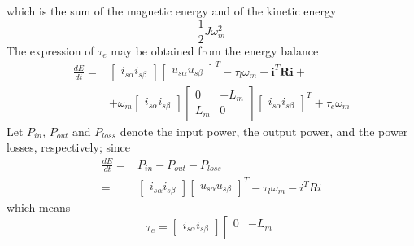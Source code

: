 \documentclass[12pt,a4paper]{scrartcl}
\begin{document}
\begin{onehalfspace}
which is the sum of the magnetic energy and of the kinetic energy
\begin{equation}\label{eq44}
	\frac{1}{2}J\omega_m^2
\end{equation}
The expression of $\tau_e$ may be obtained from the energy balance
\begin{equation}\label{eq45}
	\begin{split}
		\frac{dE}{dt} = &
		\left[\begin{matrix}
			i_{s\alpha} i_{s\beta}
		\end{matrix}\right]
		\left[\begin{matrix}
			u_{s\alpha} u_{s\beta}
		\end{matrix}\right]^T -\tau_l\omega_m-\mathbf{i}^T\mathbf{R}\mathbf{i} + \\[6pt]
		& + \omega_m
		\left[\begin{matrix}
			i_{s\alpha} i_{s\beta}
		\end{matrix}\right]
		\left[\begin{matrix}
			0 & -L_m \\
			L_m & 0
		\end{matrix}\right]
		\left[\begin{matrix}
			i_{s\alpha} i_{s\beta}
		\end{matrix}\right]^T
		+\tau_e\omega_m
	\end{split}
\end{equation}
Let $P_{in}$, $P_{out}$ and $P_{loss}$ denote the input power, the output power, and the power losses, respectively; since
\begin{equation}\label{eq46}
	\begin{split}
		\frac{dE}{dt} = & P_{in} - P_{out} -P_{loss} \\[6pt]
		= &
		\left[\begin{matrix}
			i_{s\alpha} i_{s\beta}
		\end{matrix}\right]
		\left[\begin{matrix}
			u_{s\alpha} u_{s\beta}
		\end{matrix}\right]^T -\tau_l\omega_m-i^TRi
	\end{split}
\end{equation}
which means 
\begin{equation}\label{eq47}
	\tau_e = 
	\left[\begin{matrix}
		i_{s\alpha} i_{s\beta}
	\end{matrix}\right]
	\left[\begin{matrix}
		0 & -L_m \\

\end{matrix}
\end{equation}
\end{onehalfspace}
\end{document}
